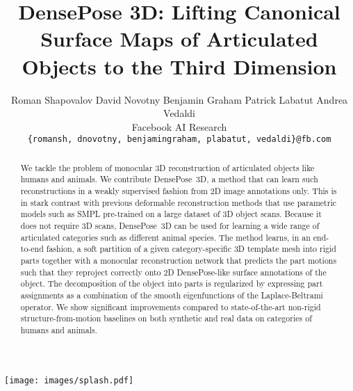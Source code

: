 \documentclass[10pt,twocolumn,letterpaper]{article}
\title{DensePose 3D\@: Lifting Canonical Surface Maps of Articulated Objects to the Third Dimension}
\author{Roman Shapovalov \quad David Novotny \quad Benjamin Graham \quad Patrick Labatut \quad Andrea Vedaldi\\
Facebook AI Research\\
{\tt\small \{romansh, dnovotny, benjamingraham, plabatut, vedaldi\}@fb.com}
}
\begin{document}
\maketitle
\begin{strip}
\vspace{-4em}
\begin{center}
\texttt{[image: images/splash.pdf]}\\
\vspace{-0.7em}
\label{f:splash}
\end{center}
\end{strip}

\begin{abstract}\vspace{-0.5em}
We tackle the problem of monocular 3D reconstruction of articulated objects like humans and animals.
We contribute DensePose~3D, a method that can learn such reconstructions in a weakly supervised fashion from 2D image annotations only.
This is in stark contrast with previous deformable reconstruction methods that use parametric models such as SMPL pre-trained on a large dataset of 3D object scans.
Because it does not require 3D scans, DensePose~3D can be used for learning a wide range of articulated categories such as different animal species.
The method learns, in an end-to-end fashion, a soft partition of a given category-specific 3D template mesh into rigid parts together with a monocular reconstruction network that predicts the part motions such that they reproject correctly onto 2D DensePose-like surface annotations of the object.
The decomposition of the object into parts is regularized by expressing part assignments as a combination of the smooth eigenfunctions of the Laplace-Beltrami operator.
We show significant improvements compared to state-of-the-art non-rigid structure-from-motion baselines on both synthetic and real data on categories of humans and animals.
\end{abstract}
\end{document}
